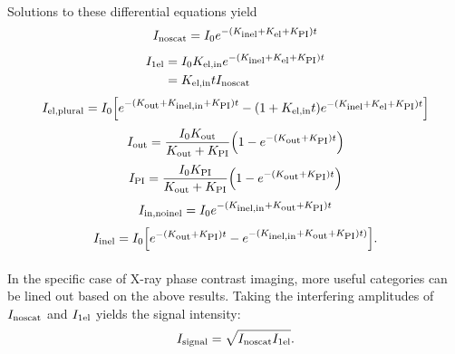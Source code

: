 \documentclass[]{article}
\newcommand\nt{\textup{\scriptsize{0}}}
\newcommand\el{\textup{\scriptsize{el}}}
\newcommand\inel{\textup{\scriptsize{inel}}}
\newcommand\elin{\textup{\scriptsize{el,in}}}
\newcommand\inelin{\textup{\scriptsize{inel,in}}}
\newcommand\out{\textup{\scriptsize{out}}}
\newcommand\PI{\textup{\scriptsize{PI}}}
\newcommand\noscat{\textup{\scriptsize{noscat}}}
\newcommand\sel{\textup{\scriptsize{1el}}}
\newcommand\elpl{\textup{\scriptsize{el,plural}}}
\newcommand\innoinel{\textup{\scriptsize{in,noinel}}}
\newcommand\signal{\textup{\scriptsize{signal}}}
\begin{document}
\paragraph{} Solutions to these differential equations yield
\begin{equation}
I_{\noscat} = I_{\nt}e^{-(K_{\inel}+K_{\el}+K_{\PI})t}
\end{equation}
\begin{equation}
\begin{aligned}
I_{\sel} &= I_{\nt}K_{\elin}e^{-(K_{\inel}+K_{\el}+K_{\PI})t} \\ &= K_{\elin}tI_{\noscat}
\end{aligned}
\end{equation}
\begin{equation}
I_{\elpl} = I_{\nt} \Big[ e^{-(K_{\out}+K_{\inelin}+K_{\PI})t} - (1+K_{\elin}t)e^{-(K_{\inel}+K_{\el}+K_{\PI})t} \Big]
\end{equation}
\begin{equation}
I_{\out} = \frac{I_{\nt}K_{\out}}{K_{\out}+K_{\PI}} \Big(1 - e^{-(K_{\out}+K_{\PI})t}\Big)
\end{equation}
\begin{equation}
I_{\PI} = \frac{I_{\nt}K_{\PI}}{K_{\out}+K_{\PI}} \Big(1 - e^{-(K_{\out}+K_{\PI})t}\Big)
\end{equation}
\begin{equation}
I_{\innoinel} = I_{\nt}e^{-(K_{\inelin}+K_{\out}+K_{\PI})t}
\end{equation}
\begin{equation}
I_{\inel} = I_{\nt}\Big[e^{-(K_{\out}+K_{\PI})t} - e^{-(K_{\inelin}+K_{\out}+K_{\PI})t)}\Big].
\end{equation}

\paragraph{} In the specific case of X-ray phase contrast imaging, more useful categories can be lined out based on the above results. Taking the interfering amplitudes of $I_{\noscat}$ and $I_{\sel}$ yields the signal intensity:
\begin{equation}
I_{\signal} = \sqrt{I_{\noscat}I_{\sel}}.
\end{equation}
\end{document}
